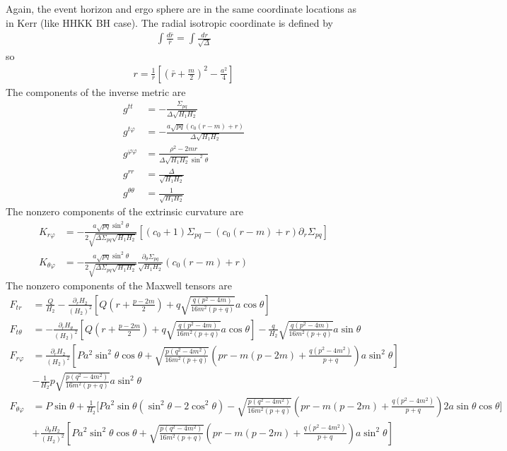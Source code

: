 \documentclass[prd]{revtex4}
\begin{document}
Again, the event horizon and ergo sphere are in the same coordinate locations as in Kerr (like HHKK BH case). The radial isotropic coordinate is defined by
\begin{align}
\int \frac{d \bar{r}}{\bar{r}} = \int \frac{dr}{\sqrt{\Delta}}
\end{align}
so
\begin{align}
r = \frac{1}{\bar{r}} \left[ \left(\bar{r} + \frac{m}{2} \right)^2 - \frac{a^2}{4} \right]
\end{align}
The components of the inverse metric are
\begin{align}
g^{tt} &= -\frac{\Sigma_{pq}}{\Delta \sqrt{H_1 H_2}} \\
g^{t \varphi} &= - \frac{a \sqrt{pq} (c_0 (r-m) + r)}{\Delta \sqrt{H_1 H_2}} \\
g^{\varphi \varphi} &= \frac{\rho^2 - 2mr}{\Delta \sqrt{H_1 H_2} \sin^2 \theta} \\
g^{rr} &= \frac{\Delta}{\sqrt{H_1 H_2}} \\
g^{\theta \theta} &= \frac{1}{\sqrt{H_1 H_2}}
\end{align}
The nonzero components of the extrinsic curvature are
\begin{align}
K_{r \varphi} &= -\frac{a \sqrt{pq} \sin^2 \theta}{2 \sqrt{ \Delta \Sigma_{pq} \sqrt{H_1 H_2}}} \left[(c_0 +1) \Sigma_{pq} - (c_0 (r-m) +r) \partial_r \Sigma_{pq} \right]\\
K_{\theta \varphi} &= -\frac{a \sqrt{pq} \sin^2 \theta}{2 \sqrt{ \Delta \Sigma_{pq} \sqrt{H_1 H_2}}} \frac{\partial_\theta \Sigma_{pq}}{\sqrt{H_1 H_2}} (c_0 (r-m) +r) 
\end{align}
The nonzero components of the Maxwell tensors are
\begin{align}
F_{tr} &= \frac{Q}{H_2} - \frac{\partial_r H_2}{(H_2)^2} \left[ Q \left(r+\frac{p-2m}{2} \right) + q \sqrt{\frac{q(p^2-4m)}{16m^2(p+q)}} a \cos \theta \right] \\
F_{t \theta} &= - \frac{\partial_r H_\theta}{(H_2)^2} \left[ Q \left(r+\frac{p-2m}{2} \right) + q \sqrt{\frac{q(p^2-4m)}{16m^2(p+q)}} a \cos \theta \right] - \frac{q}{H_2} \sqrt{\frac{q(p^2-4m)}{16m^2(p+q)}} a \sin \theta\\
F_{r \varphi} &= \frac{\partial_r H_2}{(H_2)^2} \left[P a^2 \sin^2 \theta \cos \theta + \sqrt{\frac{p(q^2-4m^2)}{16m^2(p+q)}} \left(pr - m (p-2m) +\frac{q(p^2-4m^2)}{p+q} \right) a \sin^2 \theta \right] \nonumber \\
		    &-\frac{1}{H_2} p \sqrt{\frac{p(q^2-4m^2)}{16m^2(p+q)}} a \sin^2 \theta\\
F_{\theta \varphi} &= P \sin \theta + \frac{1}{H_2} \Bigg[P a^2 \sin \theta (\sin^2 \theta - 2 \cos^2 \theta) 
			- \sqrt{\frac{p(q^2-4m^2)}{16m^2(p+q)}} \left(pr - m (p-2m) +\frac{q(p^2-4m^2)}{p+q} \right) 2a \sin \theta \cos \theta \Bigg] \nonumber \\
			&+\frac{\partial_\theta H_2}{(H_2)^2} \left[P a^2 \sin^2 \theta \cos \theta + \sqrt{\frac{p(q^2-4m^2)}{16m^2(p+q)}} \left(pr - m (p-2m) +\frac{q(p^2-4m^2)}{p+q} \right) a \sin^2 \theta \right]
\end{align}
\end{document}
